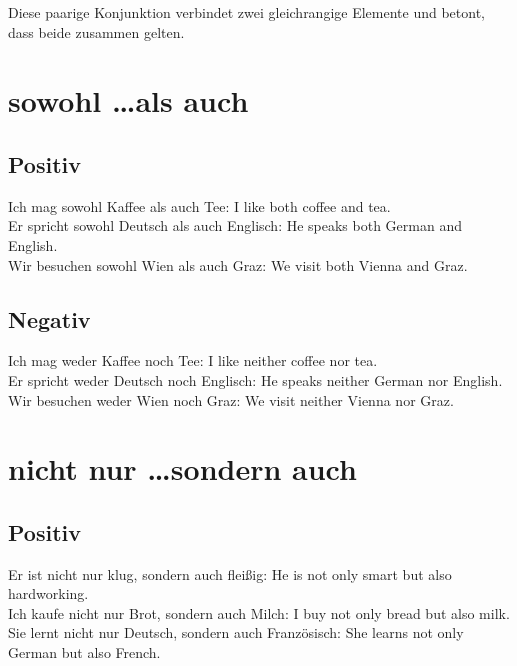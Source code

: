 \documentclass[a4paper]{article}
\title{}
\date{}
\begin{document}
    \maketitle
    Diese paarige Konjunktion verbindet zwei gleichrangige Elemente und betont, dass beide zusammen gelten.
    
    
    \section{sowohl \dots als auch}
        
        \subsection{Positiv}
            Ich mag sowohl Kaffee als auch Tee: I like both coffee and tea. \\
            Er spricht sowohl Deutsch als auch Englisch: He speaks both German and English. \\
            Wir besuchen sowohl Wien als auch Graz: We visit both Vienna and Graz. \\
        
        \subsection{Negativ}
            Ich mag weder Kaffee noch Tee: I like neither coffee nor tea. \\
            Er spricht weder Deutsch noch Englisch: He speaks neither German nor English. \\
            Wir besuchen weder Wien noch Graz: We visit neither Vienna nor Graz. \\
    
    
    \section{nicht nur \dots sondern auch}
        
        \subsection{Positiv}
            Er ist nicht nur klug, sondern auch fleißig: He is not only smart but also hardworking. \\
            Ich kaufe nicht nur Brot, sondern auch Milch: I buy not only bread but also milk. \\
            Sie lernt nicht nur Deutsch, sondern auch Französisch: She learns not only German but also French. \\
        
\end{document}
